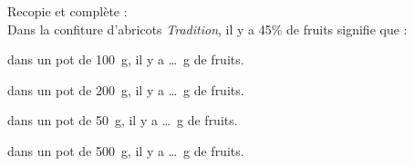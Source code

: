 Recopie et complète :
\\\og{}Dans la confiture d'abricots {\em Tradition}, il y a 45\% de fruits\fg{} signifie que :
\begin{myenumerate}
  \item dans un pot de 100~g, il y a \ldots~g de fruits.
  \item dans un pot de 200~g, il y a \ldots~g de fruits.
  \item dans un pot de 50~g, il y a \ldots~g de fruits.
  \item dans un pot de 500~g, il y a \ldots~g de fruits.
\end{myenumerate}

